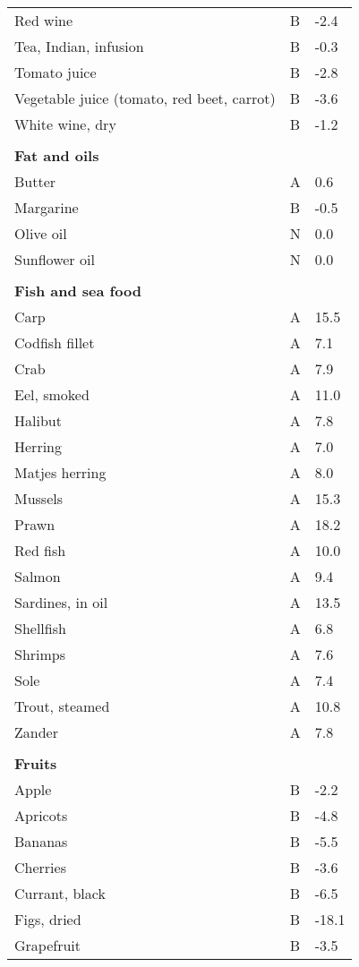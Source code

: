 \documentclass[../main.tex]{subfiles}
\begin{document}
\begin{longtable}{p{7cm}p{0.5cm}p{1cm}}
Red wine  & B   & -2.4 \\
Tea, Indian, infusion  & B   & -0.3 \\
Tomato juice  & B   & -2.8 \\
Vegetable juice (tomato, red beet, carrot)   & B   & -3.6 \\
White wine, dry  & B   & -1.2 \\
 \\
\multicolumn{3}{l}{\textbf{Fat and oils}}  \\
Butter  & A   & 0.6 \\
Margarine  & B  & -0.5 \\
Olive oil  & N  & 0.0 \\
Sunflower oil  & N  & 0.0 \\
 \\
\multicolumn{3}{l}{\textbf{Fish and sea food}}  \\
Carp   & A   & 15.5 \\
Codfish fillet   & A   & 7.1 \\
Crab   & A   & 7.9 \\
Eel, smoked   & A   & 11.0 \\
Halibut   & A   & 7.8 \\
Herring   & A   & 7.0 \\
Matjes herring   & A   & 8.0 \\
Mussels   & A   & 15.3 \\
Prawn  & A   & 18.2 \\
Red fish   & A   & 10.0 \\
Salmon   & A   & 9.4 \\
Sardines, in oil   & A   & 13.5 \\
Shellfish  & A  & 6.8 \\
Shrimps  & A  & 7.6 \\
Sole  & A  & 7.4 \\
Trout, steamed   & A   & 10.8 \\
Zander   & A  & 7.8 \\
 \\
\multicolumn{3}{l}{\textbf{Fruits}} \\
Apple  & B  & -2.2 \\
Apricots  & B  & -4.8 \\
Bananas  & B  & -5.5 \\
Cherries   & B  & -3.6 \\
Currant, black  & B  & -6.5 \\
Figs, dried  & B  & -18.1 \\
Grapefruit  & B  & -3.5 \\

\end{longtable}
\end{document}
